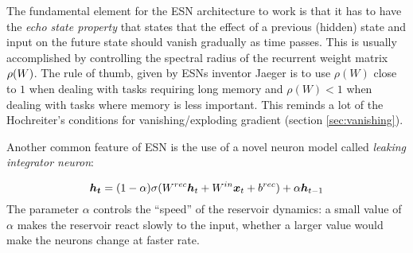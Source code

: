 The fundamental element for the ESN architecture to work is that it has to have the \textit{echo state property} that 
states that the effect of a previous (hidden) state and input on the future state should vanish gradually as time 
passes.
This is usually accomplished by controlling the spectral radius of the recurrent weight matrix $\rho(W)$.
The rule of thumb, given by ESNs inventor Jaeger is to use $\rho(W)$ close to $1$ when dealing with tasks requiring 
long memory and $\rho(W)<1$ when dealing with tasks where memory is less important.
This reminds a lot of the 
Hochreiter's conditions for vanishing/exploding gradient (section \ref{sec:vanishing}).


Another common feature of ESN is the use of a novel neuron model called \textit{leaking integrator neuron}:

\begin{equation}
 \boldsymbol{h_t} = (1-\alpha) \sigma(W^{rec}\boldsymbol{h}_t + W^{in}\boldsymbol{x}_t + b^{rec}) +\alpha \boldsymbol{h}_{t-1}
\end{equation}
 The parameter $\alpha$ controls the ``speed'' of the reservoir dynamics: a small value of $\alpha$ makes the reservoir 
react slowly to the input, whether a larger value would make the neurons change at faster rate.
